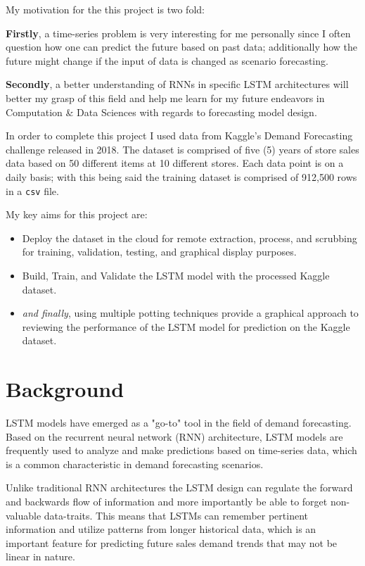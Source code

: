 \documentclass[10pt, journal, letterpaper, compsoc]{IEEEtran}
\begin{document}
My motivation for the this project is two fold:

\textbf{Firstly}, a time-series problem is very interesting for me personally since I often question how one can predict the future based on past data; additionally how the future might change if the input of data is changed as scenario forecasting.

\textbf{Secondly}, a better understanding of RNNs in specific LSTM architectures will better my grasp of this field and help me learn for my future endeavors in Computation \& Data Sciences with regards to forecasting model design.

In order to complete this project I used data from Kaggle's Demand Forecasting challenge\cite{demand-forecasting-kernels-only} released in 2018. The dataset is comprised of five (5) years of store sales data based on 50 different items at 10 different stores. Each data point is on a daily basis; with this being said the training dataset is comprised of 912,500 rows in a \texttt{csv} file. 

My key aims for this project are:
\begin{itemize}
    \item Deploy the dataset in the cloud for remote extraction, process, and scrubbing for training, validation, testing, and graphical display purposes.
    \item Build, Train, and Validate the LSTM model with the processed Kaggle\cite{demand-forecasting-kernels-only} dataset.
    \item \textit{and finally}, using multiple potting techniques provide a graphical approach to reviewing the performance of the LSTM model for prediction on the Kaggle\cite{demand-forecasting-kernels-only} dataset.
\end{itemize}

\section{Background}
LSTM models have emerged as a "go-to" tool\cite{pharma-sales-forecast-lstm, predicting-sales-lstm} in the field of demand forecasting. Based on the recurrent neural network (RNN) architecture, LSTM models are frequently used\cite{pharma-sales-forecast-lstm} to analyze and make predictions based on time-series data, which is a common characteristic in demand forecasting scenarios.

Unlike traditional RNN architectures the LSTM design can regulate the forward and backwards flow of information and more importantly be able to forget non-valuable data-traits. This means that LSTMs can remember pertinent information and utilize patterns from longer\cite{predicting-sales-lstm} historical data, which is an important feature for predicting future sales demand trends that may not be linear in nature\cite{improved-sales-forecasting}.
\end{document}
